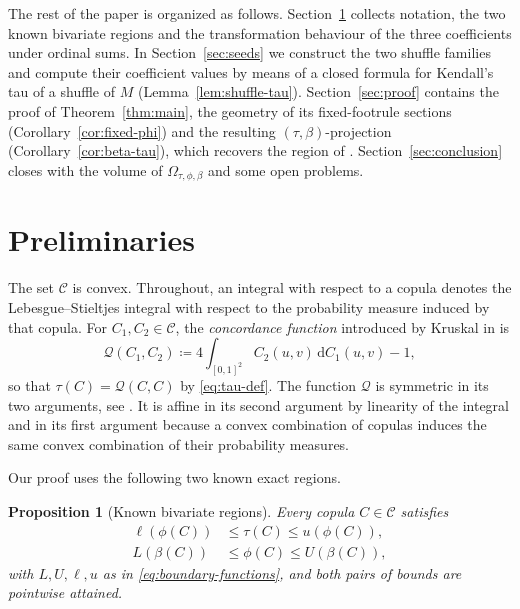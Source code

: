 \documentclass{article}
\newtheorem{proposition}[theorem]{Proposition}
\newcommand{\C}{\mathcal{C}}
\newcommand{\I}{[0,1]}
\newcommand{\Q}{\mathcal{Q}}
\newcommand{\de}{\,\mathrm{d}}
\newcommand{\Om}{\Omega_{\tau,\phi,\beta}}
\begin{document}
The rest of the paper is organized as follows.
Section~\ref{sec:prelim} collects notation, the two known bivariate regions and the transformation behaviour of the three coefficients under ordinal sums.
In Section~\ref{sec:seeds} we construct the two shuffle families and compute their coefficient values by means of a closed formula for Kendall's tau of a shuffle of $M$ (Lemma~\ref{lem:shuffle-tau}).
Section~\ref{sec:proof} contains the proof of Theorem~\ref{thm:main}, the geometry of its fixed-footrule sections (Corollary~\ref{cor:fixed-phi}) and the resulting $(\tau,\beta)$-projection (Corollary~\ref{cor:beta-tau}), which recovers the region of \cite{kokolbukovsek2019relation}.
Section~\ref{sec:conclusion} closes with the volume of $\Om$ and some open problems.

\section{Preliminaries}\label{sec:prelim}

The set $\C$ is convex.
Throughout, an integral with respect to a copula denotes the Lebesgue--Stieltjes integral with respect to the probability measure induced by that copula.
For $C_1,C_2\in\C$, the \emph{concordance function} introduced by Kruskal in \cite{kruskal1958ordinal} is
\begin{equation}\label{eq:Q-def}
\Q(C_1,C_2)\coloneqq 4\int_{\I^2} C_2(u,v)\de C_1(u,v)-1,
\end{equation}
so that $\tau(C)=\Q(C,C)$ by \eqref{eq:tau-def}.
The function $\Q$ is symmetric in its two arguments, see \cite[Cor.~5.1.2]{nelsen2006introduction}.
It is affine in its second argument by linearity of the integral and in its first argument because a convex combination of copulas induces the same convex combination of their probability measures.

Our proof uses the following two known exact regions.

\begin{proposition}[Known bivariate regions]\label{prop:known}
Every copula $C\in\C$ satisfies
\begin{align}
\ell(\phi(C))&\le\tau(C)\le u(\phi(C)),\label{eq:ft-region}\\
L(\beta(C))&\le\phi(C)\le U(\beta(C)),\label{eq:bf-region}
\end{align}
with $L,U,\ell,u$ as in \eqref{eq:boundary-functions}, and both pairs of bounds are pointwise attained.
\end{proposition}
\end{document}

